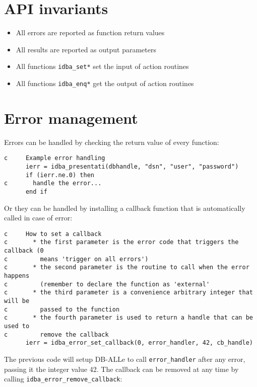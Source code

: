 \documentclass[final,12pt,a4paper,twoside]{book}
\begin{document}
\section {API invariants}

\label{fun-error}

\begin{itemize}
\item All errors are reported as function return values
\item All results are reported as output parameters
\item All functions {\tt idba\_set*} set the input of action routines
\item All functions {\tt idba\_enq*} get the output of action routines
\end{itemize}

\section {Error management}

Errors can be handled by checking the return value of every function:

\begin{verbatim}
c     Example error handling
      ierr = idba_presentati(dbhandle, "dsn", "user", "password")
      if (ierr.ne.0) then
c       handle the error...
      end if
\end{verbatim}

Or they can be handled by installing a callback function that is automatically
called in case of error:

\begin{verbatim}
c     How to set a callback
c       * the first parameter is the error code that triggers the callback (0
c         means 'trigger on all errors')
c       * the second parameter is the routine to call when the error happens        
c         (remember to declare the function as 'external'
c       * the third parameter is a convenience arbitrary integer that will be
c         passed to the function
c       * the fourth parameter is used to return a handle that can be used to
c         remove the callback
      ierr = idba_error_set_callback(0, error_handler, 42, cb_handle)
\end{verbatim}

The previous code will setup DB-ALLe to call {\tt error\_handler} after any error,
passing it the integer value 42.  The callback can be removed at any time by
calling {\tt idba\_error\_remove\_callback}:
 
\end{document}
